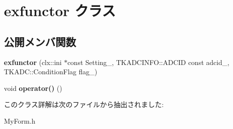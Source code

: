 \hypertarget{classexfunctor}{}\section{exfunctor クラス}
\label{classexfunctor}
\subsection*{公開メンバ関数}
\begin{DoxyCompactItemize}
\item 
\mbox{\label{classexfunctor_accfd2862866174ecf26ade95ae3cb8b4}} 
{\bfseries exfunctor} (clx\+::ini $\ast$const Setting\+\_\+, T\+K\+A\+D\+C\+I\+N\+F\+O\+::\+A\+D\+C\+ID const adcid\+\_\+, T\+K\+A\+D\+C\+::\+Condition\+Flag flag\+\_\+)
\item 
\mbox{\label{classexfunctor_add31fc15807f9bc3efe7761173213c44}} 
void {\bfseries operator()} ()
\end{DoxyCompactItemize}


このクラス詳解は次のファイルから抽出されました\+:\begin{DoxyCompactItemize}
\item 
My\+Form.\+h\end{DoxyCompactItemize}
